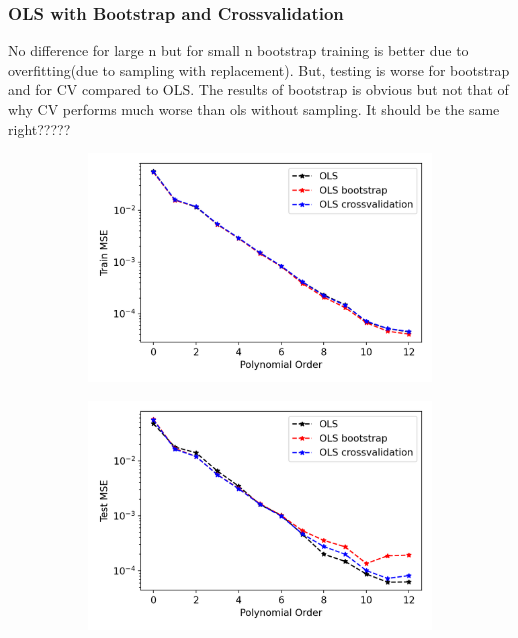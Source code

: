 \subsubsection{OLS with Bootstrap and Crossvalidation}
No difference for large n but for small n bootstrap training is better due to overfitting(due to sampling with replacement). But, testing is worse for bootstrap and for CV compared to OLS. The results of bootstrap is obvious but not that of why CV performs much worse than ols without sampling. It should be the same right?????

\begin{figure}
\centering
\begin{subfigure}{.5\textwidth}
  \centering
  \includegraphics[width=.9\linewidth]{Images/ols9.png}
  \caption{}
  \label{fig:ols9}
\end{subfigure}%
\begin{subfigure}{.5\textwidth}
  \centering
  \includegraphics[width=.9\linewidth]{Images/ols8.png}
  \caption{}
  \label{fig:ols8}
\end{subfigure}

\end{figure}
